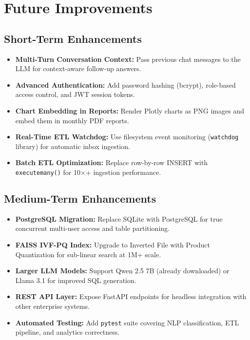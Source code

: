 \documentclass[12pt, a4paper, twoside]{article}
\begin{document}
\newpage

\section{Future Improvements}

\subsection{Short-Term Enhancements}

\begin{itemize}[leftmargin=*, itemsep=4pt]
  \item \textbf{Multi-Turn Conversation Context:} Pass previous chat messages to the LLM for context-aware follow-up answers.
  \item \textbf{Advanced Authentication:} Add password hashing (bcrypt), role-based access control, and JWT session tokens.
  \item \textbf{Chart Embedding in Reports:} Render Plotly charts as PNG images and embed them in monthly PDF reports.
  \item \textbf{Real-Time ETL Watchdog:} Use filesystem event monitoring (\texttt{watchdog} library) for automatic inbox ingestion.
  \item \textbf{Batch ETL Optimization:} Replace row-by-row INSERT with \texttt{executemany()} for 10$\times$+ ingestion performance.
\end{itemize}

\subsection{Medium-Term Enhancements}

\begin{itemize}[leftmargin=*, itemsep=4pt]
  \item \textbf{PostgreSQL Migration:} Replace SQLite with PostgreSQL for true concurrent multi-user access and table partitioning.
  \item \textbf{FAISS IVF-PQ Index:} Upgrade to Inverted File with Product Quantization for sub-linear search at 1M+ scale.
  \item \textbf{Larger LLM Models:} Support Qwen 2.5 7B (already downloaded) or Llama 3.1 for improved SQL generation.
  \item \textbf{REST API Layer:} Expose FastAPI endpoints for headless integration with other enterprise systems.
  \item \textbf{Automated Testing:} Add \texttt{pytest} suite covering NLP classification, ETL pipeline, and analytics correctness.
\end{itemize}
\end{document}
